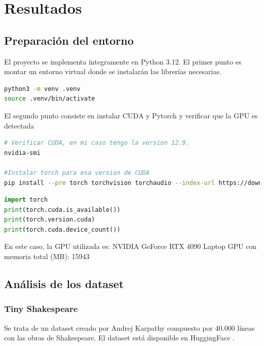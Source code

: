 \documentclass[11pt]{book}
\newcommand{\clearemptydoublepage}{\newpage{\pagestyle{empty}\cleardoublepage}}
\theoremstyle{plain}
\theoremstyle{definition}
\begin{document}

\clearemptydoublepage

\chapter{Resultados}
\section{Preparación del entorno}
El proyecto se implementa íntegramente en Python 3.12. 
El primer punto es montar un entorno virtual donde se instalarán las librerías necesarias.

\begin{lstlisting}[language=bash]
python3 -m venv .venv
source .venv/bin/activate
\end{lstlisting}
El segundo punto consiste en instalar CUDA y Pytorch y verificar que la GPU es detectada
\begin{lstlisting}[language=bash]
# Verificar CUDA, en mi caso tengo la version 12.9.
nvidia-smi

#Instalar torch para esa version de CUDA
pip install --pre torch torchvision torchaudio --index-url https://download.pytorch.org/whl/nightly/cu129
\end{lstlisting}

\begin{lstlisting}[language=Python]
import torch
print(torch.cuda.is_available())
print(torch.version.cuda)
print(torch.cuda.device_count())
\end{lstlisting}
En este caso, la GPU utilizada es: NVIDIA GeForce RTX 4090 Laptop GPU con memoria total (MB): 15943

\section{Análisis de los dataset}
\subsection{Tiny Shakespeare}
Se trata de un dataset creado por Andrej Karpathy compuesto por 40.000 líneas con las obras de Shakespeare. El dataset está disponible en HuggingFace \parencite{huggingface_tinyshakespeare}.
\end{document}
